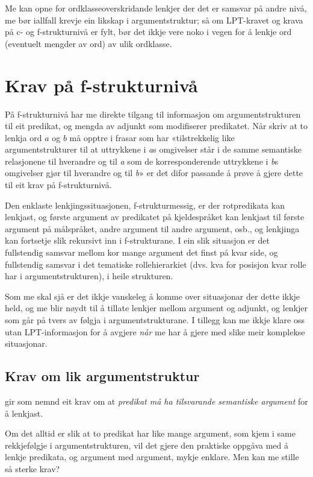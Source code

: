 \documentclass[11pt,a4paper,oneside,draft]{book}
\begin{document}
Me kan opne for ordklasseoverskridande lenkjer der det er samsvar på
andre nivå, me bør iallfall krevje ein likskap i argumentstruktur; så
om LPT-kravet og krava på c- og f-strukturnivå er fylt, bør det ikkje
vere noko i vegen for å lenkje ord (eventuelt mengder av ord) av ulik
ordklasse.


\section{Krav på f-strukturnivå}
\label{sec-3.6}

 
På f-strukturnivå har me direkte tilgang til informasjon om
argumentstrukturen til eit predikat, og mengda av adjunkt som
modifiserer predikatet. Når \citet[s.~3]{thunes2003eal} skriv at to
lenkja ord $a$ og $b$ må opptre i frasar som har «tilstrekkelig like
argumentstrukturer til at uttrykkene i \emph{a}s omgivelser står i de
samme semantiske relasjonene til hverandre og til \emph{a} som de
korresponderende uttrykkene i \emph{b}s omgivelser gjør til hverandre
og til \emph{b}» er det difor passande å prøve å gjere dette til eit
krav på f-strukturnivå.

Den enklaste lenkjingssituasjonen, f-strukturmessig, er der
rotpredikata kan lenkjast, og første argument av predikatet på
kjeldespråket kan lenkjast til første argument på målspråket, andre
argument til andre argument, osb., og lenkjinga kan fortsetje slik
rekursivt inn i f-strukturane. I ein slik situasjon er det fullstendig
samsvar mellom kor mange argument det finst på kvar side, og
fullstendig samsvar i det tematiske rollehierarkiet (dvs. kva for
posisjon kvar rolle har i argumentstrukturen), i heile strukturen.

Som me skal sjå er det ikkje vanskeleg å komme over situasjonar der
dette ikkje held, og me blir nøydt til å tillate lenkjer mellom
argument og adjunkt, og lenkjer som går på tvers av følgja i
argumentstrukturane. I tillegg kan me ikkje klare oss utan
LPT-informasjon for å avgjere \emph{når} me har å gjere med slike meir
komplekse situasjonar. 
\subsection{Krav om lik argumentstruktur}
\label{sec-3.6.1}

\label{SEC:lik-argstr}

\citet{thunes2003eal} gir som nemnd eit krav om at \emph{predikat må ha tilsvarande semantiske argument} for å lenkjast.

Om det alltid er slik at to predikat har like mange argument, som kjem i
same rekkjefølgje i argumentstrukturen, vil det gjere den praktiske
oppgåva med å lenkje predikata, og argument med argument, mykje
enklare. Men kan me stille så sterke krav?
\end{document}
